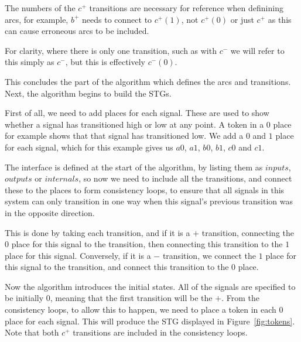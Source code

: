 \documentclass[british,conference,compsoc]{IEEEtran}
\begin{document}
The numbers of the $c^{+}$ transitions are necessary for reference
when definining arcs, for example, $b^{+}$ needs to connect to 
$c^{+}(1)$, not $c^{+}(0)$ or just $c^{+}$ as this can cause 
erroneous arcs to be included. 

For clarity, where there is only one transition, such as with $c^{-}$
we will refer to this simply as $c^{-}$, but this is effectively $c^{-}(0)$.

This concludes the part of the algorithm which defines the arcs
and transitions. Next, the algorithm begins to build the STGs. 

First of all, we need to add places for each signal. These are used to
show whether a signal has transitioned high or low at any point. 
A token in a $0$ place for example shows that that signal has 
transitioned low. We add a $0$ and $1$ place for each signal, 
which for this example gives us $a0$, $a1$, $b0$, $b1$, $c0$ and $c1$.

The interface is defined at the start of the algorithm, by listing them as 
$inputs$, $outputs$ or $internals$, so now we need to include all the 
transitions, and connect these to the places to form consistency loops, to 
ensure that all signals in this system can only transition in one way when this 
signal's previous transition was in the opposite direction. 

This is done by taking each transition, and if it is a $+$ transition, 
connecting the $0$ place for this signal to the transition, then connecting 
this transition to the $1$ place for this signal. Conversely, if it is a $-$ 
transition, we connect the $1$ place for this signal to the transition, and 
connect this transition to the $0$ place.


Now the algorithm introduces the initial states. All of the signals are 
specified to be initially 0, meaning that the first transition will be the $+$.
From the consistency loops, to allow this to happen, we need to place a token 
in each $0$ place for each signal. This will produce the STG displayed in 
Figure~\ref{fig:tokens}. Note that both $c^{+}$ transitions are 
included in the consistency loops.
\end{document}
